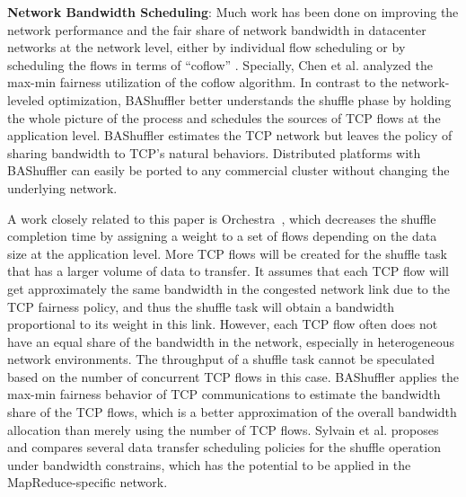 \documentclass[10pt,journal,compsoc]{IEEEtran}
\begin{document}
\textbf{Network Bandwidth Scheduling}:
Much work has been done on
improving the network performance and the fair share of network bandwidth
in datacenter networks at the network level, 
either by individual flow scheduling \cite{greenberg2009vl2, popa2012faircloud, shieh2011sharing,ballani2011towards} 
or by scheduling the flows in terms of ``coflow'' \cite{dogar2014decentralized, chowdhury2014efficient, Qiu:2015:MTW, chowdhury2015efficient, zhao2015rapier, chen2016coflow}. 
Specially, Chen et al. \cite{chen2016coflow} analyzed the max-min fairness utilization of the coflow algorithm. 
In contrast to the network-leveled optimization, BAShuffler better understands the shuffle phase by holding the whole picture of the process and schedules the sources
of TCP flows at the application level.
BAShuffler estimates the TCP network but leaves the policy of sharing bandwidth
to TCP's natural behaviors.
Distributed platforms with BAShuffler can easily be ported to any commercial cluster
without changing the underlying network.

A work closely related to this paper is Orchestra~\cite{chowdhury2011managing}, which decreases the shuffle completion
time by assigning a weight to a set of flows
depending on the data size at the application level. 
More TCP flows will be created for the shuffle task that has a larger
volume of data to transfer.
It assumes that each TCP flow will get approximately the same bandwidth 
in the congested network link due to the TCP fairness policy, 
and thus the shuffle task will obtain a bandwidth proportional to
its weight in this link.
However, each TCP flow often does not have an equal share
of the bandwidth in the network,
especially in heterogeneous network environments. 
The throughput of a shuffle task cannot be speculated based on the
number of concurrent TCP flows in this case.
BAShuffler applies the max-min fairness behavior of TCP communications
to estimate the bandwidth share of the TCP flows,
which is a better approximation of the overall bandwidth allocation
than merely using the number of TCP flows.
Sylvain et al. \cite{gault2014dynamic} proposes and compares several data transfer scheduling policies for the shuffle operation under bandwidth constrains, 
which has the potential to be applied in the MapReduce-specific network. 


\end{document}
